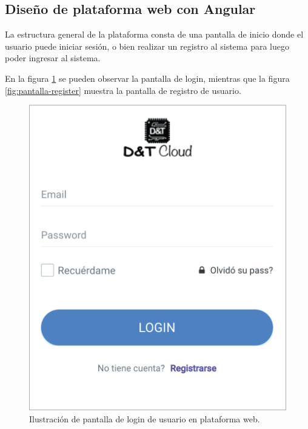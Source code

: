 \subsection{Diseño de plataforma web con Angular}

La estructura general de la plataforma consta de una pantalla de inicio donde el usuario puede iniciar sesión, o bien realizar un registro al sistema para luego poder ingresar al sistema. 

En la figura \ref{fig:pantalla-login} se pueden observar la pantalla de login, mientras que la figura \ref{fig:pantalla-register} muestra la pantalla de registro de usuario. 

\begin{figure}[htpb]
	\centering
	\includegraphics[scale=.60]{./Figures/pantalla-login.png}
	\caption[Pantalla de login de usuario]{Ilustración de pantalla de login de usuario en plataforma web.}
	\label{fig:pantalla-login}
\end{figure}
\pagebreak
